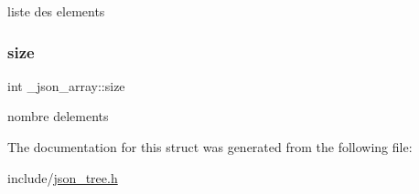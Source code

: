 liste des elements \mbox{\label{struct__json__array_a94e78470cab37adc7200c745981e917f}} 
\subsubsection{\texorpdfstring{size}{size}}
{\footnotesize\ttfamily int \+\_\+json\+\_\+array\+::size}

nombre d\textquotesingle{}elements 

The documentation for this struct was generated from the following file\+:\begin{DoxyCompactItemize}
\item 
include/\hyperlink{json__tree_8h}{json\+\_\+tree.\+h}\end{DoxyCompactItemize}
